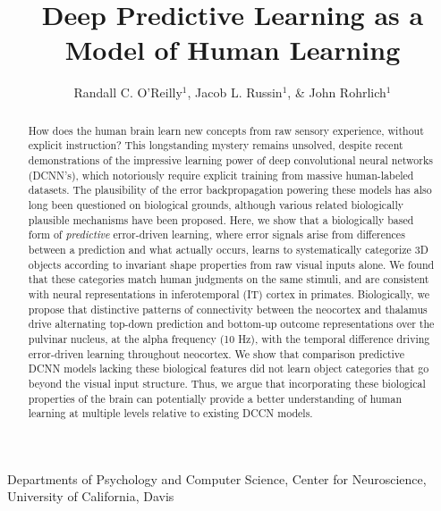 \documentclass[12pt,twoside]{naturefigs}  %
\title{ Deep Predictive Learning as a Model of Human Learning }
\author{Randall C. O'Reilly$^{1}$, Jacob L. Russin$^1$, \& John Rohrlich$^1$}
\newif\myifpdf
\begin{document}
\sloppy
\raggedbottom
{}

\maketitle 

\begin{affiliations}
  \item Departments of Psychology and Computer Science, Center for Neuroscience, 
  University of California, Davis
\end{affiliations}

\pagestyle{myheadings}

\begin{abstract}
How does the human brain learn new concepts from raw sensory experience, without explicit instruction?  This longstanding mystery remains unsolved, despite recent demonstrations of the impressive learning power of deep convolutional neural networks (DCNN's), which notoriously require explicit training from massive human-labeled datasets\cite{KrizhevskySutskeverHinton12,LeCunBengioHinton15,Schmidhuber15a}.  The plausibility of the error backpropagation\cite{RumelhartHintonWilliams86} powering these models has also long been questioned on biological grounds\cite{Crick89}, although various related biologically plausible mechanisms have been proposed\cite{OReilly96,XieSeung03,BengioMesnardFischerEtAl17}.  Here, we show that a biologically based form of {\em predictive} error-driven learning, where error signals arise from differences between a prediction and what actually occurs\cite{Elman90,ElmanBatesKarmiloff-SmithEtAl96}, learns to systematically categorize 3D objects according to invariant shape properties from raw visual inputs alone.  We found that these categories match human judgments on the same stimuli, and are consistent with neural representations in inferotemporal (IT) cortex in primates\cite{CadieuHongYaminsEtAl14}.  Biologically, we propose that distinctive patterns of connectivity between the neocortex and thalamus\cite{ShermanGuillery06} drive alternating top-down prediction and bottom-up outcome representations over the pulvinar nucleus, at the alpha frequency (10 Hz), with the temporal difference driving error-driven learning throughout neocortex.  We show that comparison predictive DCNN models lacking these biological features\cite{LotterKreimanCox16} did not learn object categories that go beyond the visual input structure.  Thus, we argue that incorporating these biological properties of the brain can potentially provide a better understanding of human learning at multiple levels relative to existing DCCN models.
\end{abstract}
\end{document}
